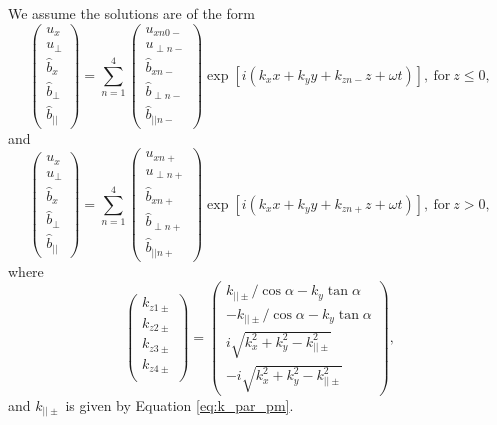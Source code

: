 We assume the solutions are of the form
\begin{equation}
    \label{eq:oblique_field_piecewise_constant_summation}
    \begin{pmatrix}
    u_x \\
    u_\perp \\
    \hat{b}_x \\
    \hat{b}_\perp \\
    \hat{b}_{||}
    \end{pmatrix}
    =
    \sum_{n=1}^{4} \begin{pmatrix}
    u_{xn0-} \\
    u_{\perp n-} \\
    \hat{b}_{xn-} \\
    \hat{b}_{\perp n-} \\
    \hat{b}_{||n-}
    \end{pmatrix}
    \exp[i(k_x x + k_y y + k_{zn-}z + \omega t)],\ \text{for}\ z\le 0,
\end{equation}
and 
\begin{equation}
    \begin{pmatrix}
    u_x \\
    u_\perp \\
    \hat{b}_x \\
    \hat{b}_\perp \\
    \hat{b}_{||}
    \end{pmatrix}
    =
    \sum_{n=1}^{4} \begin{pmatrix}
    u_{xn+} \\
    u_{\perp n+} \\
    \hat{b}_{xn+} \\
    \hat{b}_{\perp n+} \\
    \hat{b}_{||n+}
    \end{pmatrix}
    \exp[i(k_x x + k_y y + k_{zn+}z + \omega t)],\ \text{for}\ z> 0,
\end{equation}
where
\begin{equation}
\begin{pmatrix}
k_{z1\pm} \\
k_{z2\pm} \\
k_{z3\pm} \\
k_{z4\pm} \\
\end{pmatrix}
=
\begin{pmatrix}
 k_{||\pm}/\cos\alpha - k_y\tan\alpha \\
-k_{||\pm}/\cos\alpha - k_y\tan\alpha \\
 i\sqrt{k_x^2+k_y^2 - k_{||\pm}^2} \\
-i\sqrt{k_x^2+k_y^2 - k_{||\pm}^2}
\end{pmatrix},
\end{equation}
and $k_{||\pm}$ is given by Equation \eqref{eq:k_par_pm}.

